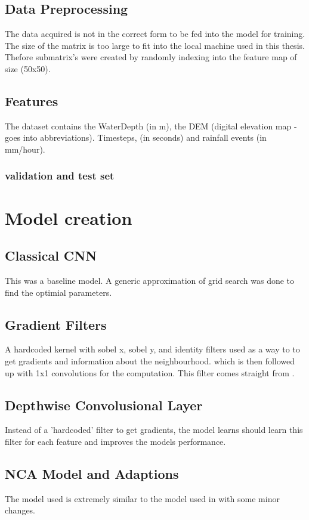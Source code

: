 \subsection{Data Preprocessing}
The data acquired is not in the correct form to be fed into the model for training. The size of the matrix is too large to fit into the local machine used in this thesis. Thefore submatrix's were created by randomly indexing into the feature map of size (50x50).

\subsection{Features}
The dataset contains the WaterDepth (in m), the DEM (digital elevation map - goes into abbreviations). Timesteps, (in seconds) and rainfall events (in mm/hour).
\subsubsection{validation and test set}

\section{Model creation}
\subsection{Classical CNN}
This was a baseline model. A generic approximation of grid search was done to find the optimial parameters.
\subsection{Gradient Filters}
A hardcoded kernel with sobel x, sobel y, and identity filters used as a way to to get gradients and information about the neighbourhood. which is then followed up with 1x1 convolutions for the computation. This filter comes straight from \cite{growing_nca}.

\subsection{Depthwise Convolusional Layer}
Instead of a 'hardcoded' filter to get gradients, the model learns should learn this filter for each feature and improves the models performance.


\subsection{NCA Model and Adaptions}
The model used is extremely similar to the model used in \cite{growing_nca} with some minor changes.

